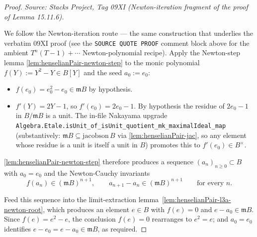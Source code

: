 \begin{proof}

\leanok
\textit{Source: Stacks Project, Tag 09XI (Newton-iteration fragment of the proof of Lemma 15.11.6).}

We follow the Newton-iteration route — the same construction that
underlies the verbatim 09XI proof (see the \texttt{SOURCE QUOTE PROOF}
comment block above for the ambient $T^n(T-1) + \cdots$ Newton-polynomial
recipe). Apply the Newton-step lemma
\cref{lem:henselianPair-newton-step} to the monic polynomial
$f(Y) := Y^2 - Y \in B[Y]$ and the seed $a_0 := e_0$:
\begin{itemize}
\item $f(e_0) = e_0^2 - e_0 \in \mathfrak m B$ by hypothesis.
\item $f'(Y) = 2Y - 1$, so $f'(e_0) = 2 e_0 - 1$. By hypothesis the
  residue of $2 e_0 - 1$ in $B / \mathfrak m B$ is a unit. The in-file
  Nakayama upgrade
  \texttt{Algebra.Etale.isUnit\_of\_isUnit\_quotient\_mk\_maximalIdeal\_map}
  (substantively: $\mathfrak m B \subseteq \mathrm{jacobson}\,B$ via
  \cref{lem:henselianPair-jac}, so any element whose residue is a unit
  is itself a unit in $B$) promotes this to $f'(e_0) \in B^\times$.
\end{itemize}
\cref{lem:henselianPair-newton-step} therefore produces a sequence
$(a_n)_{n \ge 0} \subset B$ with $a_0 = e_0$ and the Newton-Cauchy
invariants
\[
  f(a_n) \in (\mathfrak m B)^{n+1},
  \qquad
  a_{n+1} - a_n \in (\mathfrak m B)^{n+1}
  \qquad \text{for every } n.
\]

Feed this sequence into the limit-extraction
lemma~\cref{lem:henselianPair-l3a-newton-root}, which produces an
element $e \in B$ with $f(e) = 0$ and $e - a_0 \in \mathfrak m B$.
Since $f(e) = e^2 - e$, the conclusion $f(e) = 0$ rearranges to
$e^2 = e$; and $a_0 = e_0$ identifies $e - e_0 = e - a_0 \in
\mathfrak m B$, as required.
\end{proof}

